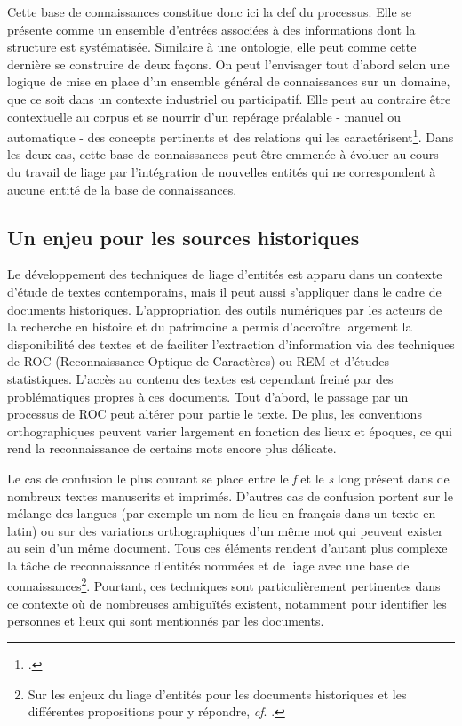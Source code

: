 \documentclass[a4paper,12pt,twoside]{book}
\begin{document}
	Cette base de connaissances constitue donc ici la clef du processus. Elle se présente comme un ensemble d'entrées associées à des informations dont la structure est systématisée. Similaire à une ontologie, elle peut comme cette dernière se construire de deux façons. On peut l'envisager tout d'abord selon une logique de mise en place d'un ensemble général de connaissances sur un domaine, que ce soit dans un contexte industriel ou participatif. Elle peut au contraire être contextuelle au corpus et se nourrir d'un repérage préalable - manuel ou automatique - des concepts pertinents et des relations qui les caractérisent\footcite[p. 33]{stern_identification_2013}. Dans les deux cas, cette base de connaissances peut être emmenée à évoluer au cours du travail de liage par l'intégration de nouvelles entités qui ne correspondent à aucune entité de la base de connaissances.
	
	\subsection{Un enjeu pour les sources historiques}
	
	Le développement des techniques de liage d'entités est apparu dans un contexte d'étude de textes contemporains, mais il peut aussi s'appliquer dans le cadre de documents historiques. L'appropriation des outils numériques par les acteurs de la recherche en histoire et du patrimoine a permis d'accroître largement la disponibilité des textes et de faciliter l'extraction d'information via des techniques de ROC (Reconnaissance Optique de Caractères) ou REM et d'études statistiques. L'accès au contenu des textes est cependant freiné par des problématiques propres à ces documents. Tout d'abord, le passage par un processus de ROC peut altérer pour partie le texte. De plus, les conventions orthographiques peuvent varier largement en fonction des lieux et époques, ce qui rend la reconnaissance de certains mots encore plus délicate.
	
	Le cas de confusion le plus courant se place entre le \textit{f} et le \textit{s} long présent dans de nombreux textes manuscrits et imprimés. D'autres cas de confusion portent sur le mélange des langues (par exemple un nom de lieu en français dans un texte en latin) ou sur des variations orthographiques d'un même mot qui peuvent exister au sein d'un même document. Tous ces éléments rendent d'autant plus complexe la tâche de reconnaissance d'entités nommées et de liage avec une base de connaissances\footnote{Sur les enjeux du liage d'entités pour les documents historiques et les différentes propositions pour y répondre, \textit{cf}. \cite{linhares_pontes_entity_2020}.}. Pourtant, ces techniques sont particulièrement pertinentes dans ce contexte où de nombreuses ambiguïtés existent, notamment pour identifier les personnes et lieux qui sont mentionnés par les documents.
	
\end{document}
